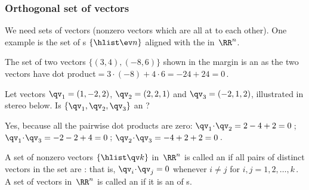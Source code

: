\subsubsection{Orthogonal set of vectors}


We need sets of  vectors (nonzero vectors which are all at  to each other).
One example is the set of s \(\{\hlist\ev n\}\) aligned with the  in~\(\RR^n\).  

\begin{example} \label{eg:orthogduo}
The set of two vectors \(\{(3,4),(-8,6)\}\) shown in the margin
%
is an  as the two vectors have dot product\({}=3\cdot(-8)+4\cdot6=-24+24=0\)\,.
\end{example}


\begin{example} \label{eg:orthogtrio}
Let vectors \(\qv_1=(1,-2,2)\), \(\qv_2=(2,2,1)\) and \(\qv_3=(-2,1,2)\), illustrated in stereo below. 
Is \(\{\qv_1,\qv_2,\qv_3\}\) an ?
\begin{center}
\end{center}

\begin{solution} 
Yes, because all the pairwise dot products are zero: \(\qv_1\cdot\qv_2=2-4+2=0\)\,; \(\qv_1\cdot\qv_3=-2-2+4=0\)\,; \(\qv_2\cdot\qv_3=-4+2+2=0\)\,. 
\end{solution}
\end{example}

\begin{definition} \label{def:orthoset} 
A set of nonzero vectors \(\{\hlist\qv k\}\) in~\(\RR^n\) is called an  if all pairs of distinct vectors in the set are : that is, \(\qv_i\cdot\qv_j=0\) whenever \(i\neq j\) for \(i,j=1,2,\ldots,k\)\,.
A set of vectors in~\(\RR^n\) is called an  if it is an  of s.
\end{definition}

